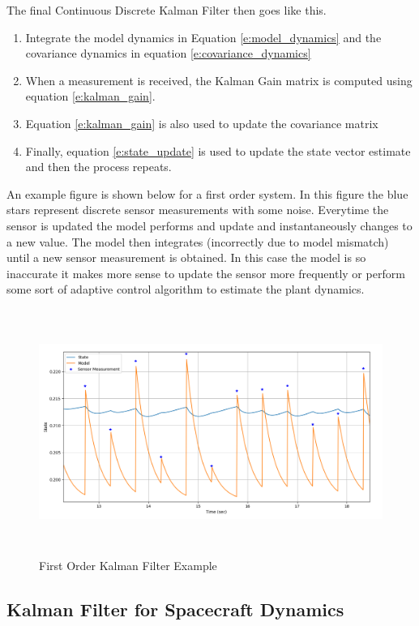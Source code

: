 The final Continuous Discrete Kalman Filter then goes like this.
\begin{enumerate}
  \item Integrate the model dynamics in Equation
    \ref{e:model_dynamics} and the covariance dynamics in equation
    \ref{e:covariance_dynamics}
  \item When a measurement is received, the Kalman Gain matrix is
    computed using equation \ref{e:kalman_gain}. 
  \item Equation \ref{e:kalman_gain} is also used to update the
    covariance matrix
  \item Finally, equation \ref{e:state_update} is used to update the
    state vector estimate and then the process repeats.
\end{enumerate}
An example figure is shown below for a first order system. In this
figure the blue stars represent discrete sensor measurements with some
noise. Everytime the sensor is updated the model performs and update
and instantaneously changes to a new value. The model then integrates
(incorrectly due to model mismatch) until a new sensor measurement is
obtained. In this case the model is so inaccurate it makes more sense
to update the sensor more frequently or perform some sort of adaptive
control algorithm to estimate the plant dynamics.
\begin{figure}[H]
  \begin{center}
    \includegraphics[height=80mm, width=140mm]{Figures/Kalman_Filter_Example.png}
  \end{center}
  \caption{First Order Kalman Filter Example}\label{f:kalman}
\end{figure}
    
\subsection{Kalman Filter for Spacecraft Dynamics}

